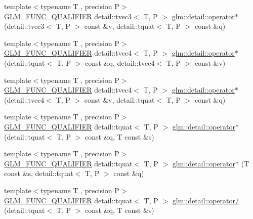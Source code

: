 \begin{DoxyCompactItemize}
\item 
{\footnotesize template$<$typename T , precision P$>$ }\\\hyperlink{setup_8hpp_a33fdea6f91c5f834105f7415e2a64407}{G\+L\+M\+\_\+\+F\+U\+N\+C\+\_\+\+Q\+U\+A\+L\+I\+F\+I\+ER} detail\+::tvec3$<$ T, P $>$ \hyperlink{namespaceglm_1_1detail_a1e3484b9cf1adf99d5cdefa17192960f}{glm\+::detail\+::operator$\ast$} (detail\+::tvec3$<$ T, P $>$ const \&v, detail\+::tquat$<$ T, P $>$ const \&q)
\item 
{\footnotesize template$<$typename T , precision P$>$ }\\\hyperlink{setup_8hpp_a33fdea6f91c5f834105f7415e2a64407}{G\+L\+M\+\_\+\+F\+U\+N\+C\+\_\+\+Q\+U\+A\+L\+I\+F\+I\+ER} detail\+::tvec4$<$ T, P $>$ \hyperlink{namespaceglm_1_1detail_afb46a99a6d108f6140e06681e2b3be04}{glm\+::detail\+::operator$\ast$} (detail\+::tquat$<$ T, P $>$ const \&q, detail\+::tvec4$<$ T, P $>$ const \&v)
\item 
{\footnotesize template$<$typename T , precision P$>$ }\\\hyperlink{setup_8hpp_a33fdea6f91c5f834105f7415e2a64407}{G\+L\+M\+\_\+\+F\+U\+N\+C\+\_\+\+Q\+U\+A\+L\+I\+F\+I\+ER} detail\+::tvec4$<$ T, P $>$ \hyperlink{namespaceglm_1_1detail_a55d4ec031a5b440d34d6f5cb475b621d}{glm\+::detail\+::operator$\ast$} (detail\+::tvec4$<$ T, P $>$ const \&v, detail\+::tquat$<$ T, P $>$ const \&q)
\item 
{\footnotesize template$<$typename T , precision P$>$ }\\\hyperlink{setup_8hpp_a33fdea6f91c5f834105f7415e2a64407}{G\+L\+M\+\_\+\+F\+U\+N\+C\+\_\+\+Q\+U\+A\+L\+I\+F\+I\+ER} detail\+::tquat$<$ T, P $>$ \hyperlink{namespaceglm_1_1detail_ae7c9ae2e54227c51aa9f316e59504a64}{glm\+::detail\+::operator$\ast$} (detail\+::tquat$<$ T, P $>$ const \&q, T const \&s)
\item 
{\footnotesize template$<$typename T , precision P$>$ }\\\hyperlink{setup_8hpp_a33fdea6f91c5f834105f7415e2a64407}{G\+L\+M\+\_\+\+F\+U\+N\+C\+\_\+\+Q\+U\+A\+L\+I\+F\+I\+ER} detail\+::tquat$<$ T, P $>$ \hyperlink{namespaceglm_1_1detail_a935c219439467864d00ca30e5620a4e1}{glm\+::detail\+::operator$\ast$} (T const \&s, detail\+::tquat$<$ T, P $>$ const \&q)
\item 
{\footnotesize template$<$typename T , precision P$>$ }\\\hyperlink{setup_8hpp_a33fdea6f91c5f834105f7415e2a64407}{G\+L\+M\+\_\+\+F\+U\+N\+C\+\_\+\+Q\+U\+A\+L\+I\+F\+I\+ER} detail\+::tquat$<$ T, P $>$ \hyperlink{namespaceglm_1_1detail_ac97f2ce870d9bf40b6108d05f8371242}{glm\+::detail\+::operator/} (detail\+::tquat$<$ T, P $>$ const \&q, T const \&s)

\end{DoxyCompactItemize}
